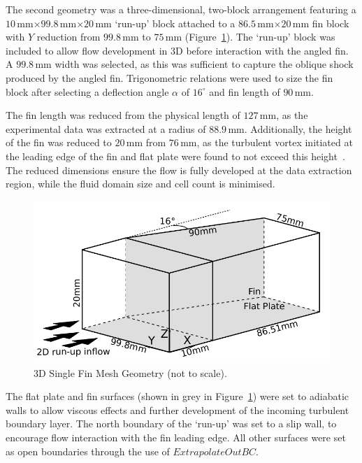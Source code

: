 The second geometry was a three-dimensional, two-block arrangement featuring a $10$\,mm$\times99.8$\,mm$\times20$\,mm `run-up' block attached to a $86.5$\,mm$\times20$\,mm fin block with $Y$ reduction from $99.8$\,mm to $75$\,mm (Figure~\ref{f:tc2:coordinates}). The `run-up' block was included to allow flow development in 3D before interaction with the angled fin. A $99.8$\,mm width was selected, as this was sufficient to capture the oblique shock produced by the angled fin. Trigonometric relations were used to size the fin block after selecting a deflection angle $\alpha$ of $16^{\circ}$ and fin length of $90$\,mm. 

The fin length was reduced from the physical length of $127$\,mm, as the experimental data was extracted at a radius of $88.9$\,mm. Additionally, the height of the fin was reduced to $20$\,mm from $76$\,mm, as the turbulent vortex initiated at the leading edge of the fin and flat plate were found to not exceed this height~\cite{panaras97}. The reduced dimensions ensure the flow is fully developed at the data extraction region, while the fluid domain size and cell count is minimised. 
%
\begin{figure}[htbp]
 \begin{center}
  \includegraphics[width=14cm]{./chap7-3Dsinglefin/figs/3Dcoordinates2.pdf}
  \caption{3D Single Fin Mesh Geometry (not to scale).}
  \label{f:tc2:coordinates}
 \end{center}
\end{figure}
%

The flat plate and fin surfaces (shown in grey in Figure~\ref{f:tc2:coordinates}) were set to adiabatic walls to allow viscous effects and further development of the incoming turbulent boundary layer. The north boundary of the `run-up' was set to a slip wall, to encourage flow interaction with the fin leading edge. All other surfaces were set as open boundaries through the use of $ExtrapolateOutBC$. 

